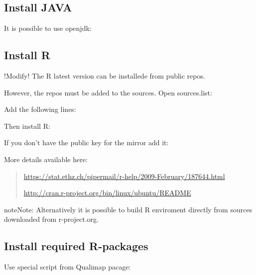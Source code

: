 \documentclass[a4paper,10pt,english]{sphinxmanual}
\begin{document}
\subsection{Install JAVA}
\label{intro:install-java}
It is possible to use openjdk:



\subsection{Install R}
\label{intro:install-r}
!Modify!
The R latest version can be installede from public repos.

However, the repos must be added to the sources. Open sources.list:


Add the following lines:


Then install R:



If you don't have the public key for the mirror add it:



More details available here:
\begin{quote}

\href{https://stat.ethz.ch/pipermail/r-help/2009-February/187644.html}{https://stat.ethz.ch/pipermail/r-help/2009-February/187644.html}

\href{http://cran.r-project.org/bin/linux/ubuntu/README}{http://cran.r-project.org/bin/linux/ubuntu/README}
\end{quote}

\begin{notice}{note}{Note:}
Alternatively it is possible to build R enviroment directly from sources downloaded from r-project.org.
\end{notice}


\subsection{Install required R-packages}
\label{intro:install-required-r-packages}
Use special script from Qualimap pacage:
\end{document}
